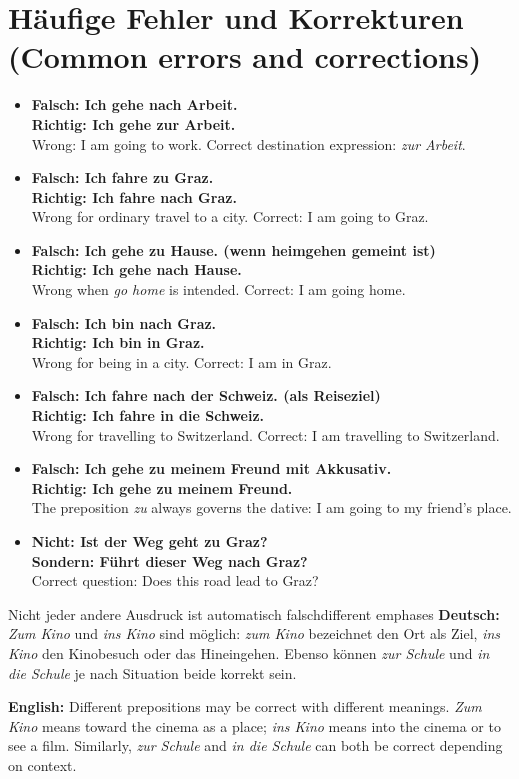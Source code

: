 \documentclass[a4paper,11pt]{article}
\newcommand{\GermanText}[1]{\textbf{Deutsch: }#1\par}
\newcommand{\EnglishText}[1]{{\small\color{SoftGray}\textbf{English: }#1\par}}
\newcommand{\ExampleItem}[2]{\item \textbf{#1}\\{\small\color{SoftGray}#2}}
\begin{document}
\section{Häufige Fehler und Korrekturen (Common errors and corrections)}
\begin{exbox}\begin{itemize}
\ExampleItem{Falsch: Ich gehe nach Arbeit.\\Richtig: Ich gehe zur Arbeit.}{Wrong: I am going to work. Correct destination expression: \emph{zur Arbeit}.}
\ExampleItem{Falsch: Ich fahre zu Graz.\\Richtig: Ich fahre nach Graz.}{Wrong for ordinary travel to a city. Correct: I am going to Graz.}
\ExampleItem{Falsch: Ich gehe zu Hause. (wenn \glqq heimgehen\grqq{} gemeint ist)\\Richtig: Ich gehe nach Hause.}{Wrong when \emph{go home} is intended. Correct: I am going home.}
\ExampleItem{Falsch: Ich bin nach Graz.\\Richtig: Ich bin in Graz.}{Wrong for being in a city. Correct: I am in Graz.}
\ExampleItem{Falsch: Ich fahre nach der Schweiz. (als Reiseziel)\\Richtig: Ich fahre in die Schweiz.}{Wrong for travelling to Switzerland. Correct: I am travelling to Switzerland.}
\ExampleItem{Falsch: Ich gehe zu meinem Freund mit Akkusativ.\\Richtig: Ich gehe zu meinem Freund.}{The preposition \emph{zu} always governs the dative: I am going to my friend's place.}
\ExampleItem{Nicht: Ist der Weg geht zu Graz?\\Sondern: Führt dieser Weg nach Graz?}{Correct question: Does this road lead to Graz?}
\end{itemize}\end{exbox}
\begin{grammarentry}{Nicht jeder andere Ausdruck ist automatisch falsch}{different emphases}
\GermanText{\emph{Zum Kino} und \emph{ins Kino} sind möglich: \emph{zum Kino} bezeichnet den Ort als Ziel, \emph{ins Kino} den Kinobesuch oder das Hineingehen. Ebenso können \emph{zur Schule} und \emph{in die Schule} je nach Situation beide korrekt sein.}
\EnglishText{Different prepositions may be correct with different meanings. \emph{Zum Kino} means toward the cinema as a place; \emph{ins Kino} means into the cinema or to see a film. Similarly, \emph{zur Schule} and \emph{in die Schule} can both be correct depending on context.}
\end{grammarentry}
\end{document}
